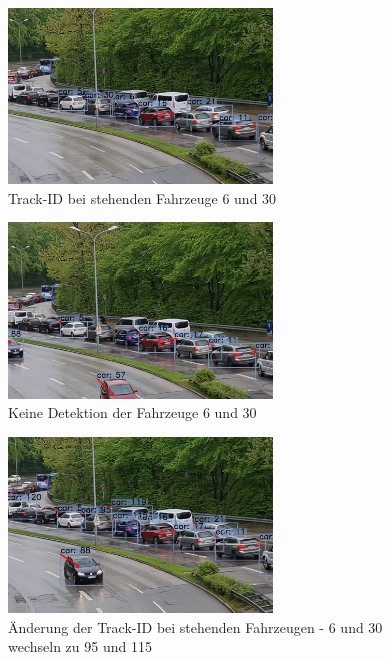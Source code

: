 \documentclass[conference]{IEEEtran}
\begin{document}
	\begin{figure}[!h]
		\begin{center}
			\includegraphics[width=7cm]{Media/track1.jpg}
			\caption{Track-ID bei stehenden Fahrzeuge 6 und 30}
			\label{track1}
		\end{center}
	\end{figure}
	\begin{figure}[!h]
		\begin{center}
			\includegraphics[width=7cm]{Media/track3.jpg}
			\caption{Keine Detektion der Fahrzeuge 6 und 30}
			\label{track1.5}
		\end{center}
	\end{figure}
	\begin{figure}[!h]
		\begin{center}
			\includegraphics[width=7cm]{Media/track2.jpg}
			\caption{Änderung der Track-ID bei stehenden Fahrzeugen - 6 und 30 wechseln zu 95 und 115}
			\label{track2}
		\end{center}
	\end{figure}
	
\end{document}
